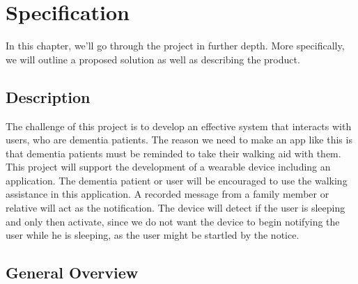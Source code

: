 \chapter{Specification}
\label{chap:specification}

In this chapter, we'll go through the project in further depth.
More specifically, we will outline a proposed solution as well as describing the
product.

\section{Description}

The challenge of this project is to develop an effective system that interacts
with users, who are dementia patients. The reason we need to make an app like
this is that dementia patients must be reminded to take their walking aid with them.
This project will support the development of a wearable device including an
application. The dementia patient or user will be encouraged to use the walking
assistance in this application. A recorded message from a family member or
relative will act as the notification. The device will detect if the user is
sleeping and only then activate, since we do not want the device to begin
notifying the user while he is sleeping, as the user might be startled by the notice.

\section{General Overview}

